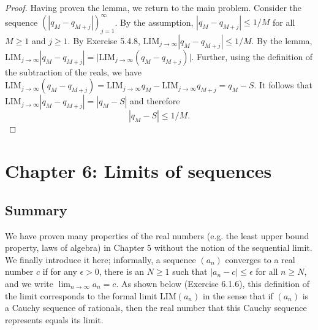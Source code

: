 \documentclass{article}
\newcommand{\ra}{\rightarrow}
\newcommand{\LIM}{{\mathrm{LIM}}}
\begin{document}
\begin{proof}
Having proven the lemma, we return to the main problem. Consider the sequence $(|q_M - q_{M + j}|)_{j = 1}^\infty$. By the assumption, $|q_M - q_{M + j}| \leq 1/M$ for all $M \geq 1$ and $j \geq 1$. By Exercise 5.4.8, $\LIM_{j \ra \infty} |q_M - q_{M + j}| \leq 1/M$. By the lemma, $\LIM_{j \ra \infty} |q_M - q_{M + j}| = \big| \LIM_{j \ra \infty} (q_M - q_{M + j}) \big|$. Further, using the definition of the subtraction of the reals, we have $\LIM_{j \ra \infty} (q_M - q_{M + j}) = \LIM_{j \ra \infty} q_M - \LIM_{j \ra \infty} q_{M + j} = q_M - S$. It follows that $\LIM_{j \ra \infty} |q_M - q_{M + j}| = |q_M - S|$ and therefore 
\[ |q_M - S| \leq 1/M. \]
\end{proof}


\section*{Chapter 6: Limits of sequences}
\subsection*{Summary}
We have proven many properties of the real numbers (e.g. the least upper bound property, laws of algebra) in Chapter 5 without the notion of the sequential limit. We finally introduce it here; informally, a sequence $(a_n)$ converges to a real number $c$ if for any $\epsilon > 0$, there is an $N \geq 1$ such that $|a_n - c | \leq \epsilon$ for all $n \geq N$, and we write $\lim_{n \ra \infty} a_n = c$. As shown below (Exercise 6.1.6), this definition of the limit corresponds to the formal limit $\LIM (a_n)$ in the sense that if $(a_n)$ is a Cauchy sequence of rationals, then the real number that this Cauchy sequence represents equals its limit.
\end{document}
